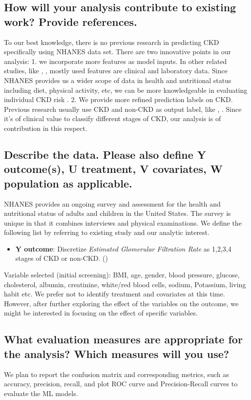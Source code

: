 \documentclass[twoside,11pt]{article}
\begin{document}
\subsection{How will your analysis contribute to existing work? Provide references.}
To our best knowledge, there is no previous research in predicting CKD specifically using NHANES data set. There are two innovative points in our analysis: 1. we incorporate more features as model inputs. In other related studies, like \cite{Vijayarani}, \cite{Charleonnan}, mostly used features are clinical and laboratory data. Since NHANES provides us a wider scope of data in health and nutritional status including diet, physical activity, etc, we can be more knowledgeable in evaluating individual CKD risk . 2. We provide more refined prediction labels on CKD. Previous research usually use CKD and non-CKD as output label, like \cite{Vijayarani}, \cite{Charleonnan}. Since it's of clinical value to classify different stages of CKD, our analysis is of contribution in this respect. 

 

\subsection{Describe the data. Please also define Y outcome(s), U treatment, V covariates, W population as applicable.}
NHANES provides an ongoing survey and assessment for the health and nutritional status of adults and children in the United States. The survey is unique in that it combines interviews and physical examinations. We define the following list by referring to existing study and our analytic interest. 
\begin{itemize}
\item \textbf{Y outcome}: Discretize \textit{Estimated Glomerular Filtration Rate} as 1,2,3,4 stages of CKD or non-CKD. (\cite{Levey})
\end{itemize}
Variable selected (initial screening):
BMI, age, gender, blood pressure, glucose, cholesterol, albumin, creatinine, white/red blood cells, sodium, Potassium, living habit etc.
We prefer not to identify treatment and covariates at this time. However, after further exploring the effect of the variables on the outcome, we might be interested in focusing on the effect of specific variables.



\subsection{What evaluation measures are appropriate for the analysis? Which measures will you use?}
We plan to report the confusion matrix and corresponding metrics, such as accuracy, precision, recall, and plot ROC curve and Precision-Recall curves to evaluate the ML models. 
\end{document}
